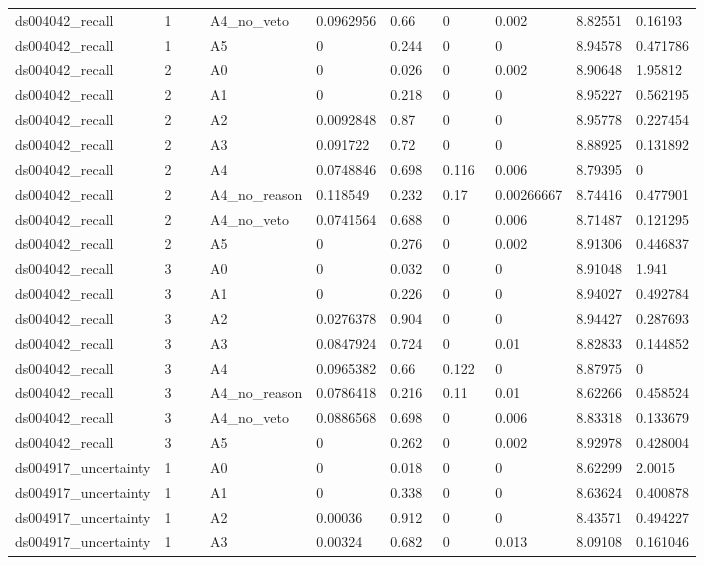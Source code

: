 \documentclass[11pt]{article}
\begin{document}
\begin{landscape}
\begin{longtable}{@{}L{0.120\linewidth}L{0.085\linewidth}L{0.085\linewidth}L{0.085\linewidth}L{0.085\linewidth}L{0.085\linewidth}L{0.085\linewidth}L{0.085\linewidth}L{0.085\linewidth}@{}}
ds004042\_recall & 1 & A4\_no\_veto & 0.0962956 & 0.66 & 0 & 0.002 & 8.82551 & 0.16193 \\
ds004042\_recall & 1 & A5 & 0 & 0.244 & 0 & 0 & 8.94578 & 0.471786 \\
ds004042\_recall & 2 & A0 & 0 & 0.026 & 0 & 0.002 & 8.90648 & 1.95812 \\
ds004042\_recall & 2 & A1 & 0 & 0.218 & 0 & 0 & 8.95227 & 0.562195 \\
ds004042\_recall & 2 & A2 & 0.0092848 & 0.87 & 0 & 0 & 8.95778 & 0.227454 \\
ds004042\_recall & 2 & A3 & 0.091722 & 0.72 & 0 & 0 & 8.88925 & 0.131892 \\
ds004042\_recall & 2 & A4 & 0.0748846 & 0.698 & 0.116 & 0.006 & 8.79395 & 0 \\
ds004042\_recall & 2 & A4\_no\_reason & 0.118549 & 0.232 & 0.17 & 0.00266667 & 8.74416 & 0.477901 \\
ds004042\_recall & 2 & A4\_no\_veto & 0.0741564 & 0.688 & 0 & 0.006 & 8.71487 & 0.121295 \\
ds004042\_recall & 2 & A5 & 0 & 0.276 & 0 & 0.002 & 8.91306 & 0.446837 \\
ds004042\_recall & 3 & A0 & 0 & 0.032 & 0 & 0 & 8.91048 & 1.941 \\
ds004042\_recall & 3 & A1 & 0 & 0.226 & 0 & 0 & 8.94027 & 0.492784 \\
ds004042\_recall & 3 & A2 & 0.0276378 & 0.904 & 0 & 0 & 8.94427 & 0.287693 \\
ds004042\_recall & 3 & A3 & 0.0847924 & 0.724 & 0 & 0.01 & 8.82833 & 0.144852 \\
ds004042\_recall & 3 & A4 & 0.0965382 & 0.66 & 0.122 & 0 & 8.87975 & 0 \\
ds004042\_recall & 3 & A4\_no\_reason & 0.0786418 & 0.216 & 0.11 & 0.01 & 8.62266 & 0.458524 \\
ds004042\_recall & 3 & A4\_no\_veto & 0.0886568 & 0.698 & 0 & 0.006 & 8.83318 & 0.133679 \\
ds004042\_recall & 3 & A5 & 0 & 0.262 & 0 & 0.002 & 8.92978 & 0.428004 \\
ds004917\_uncertainty & 1 & A0 & 0 & 0.018 & 0 & 0 & 8.62299 & 2.0015 \\
ds004917\_uncertainty & 1 & A1 & 0 & 0.338 & 0 & 0 & 8.63624 & 0.400878 \\
ds004917\_uncertainty & 1 & A2 & 0.00036 & 0.912 & 0 & 0 & 8.43571 & 0.494227 \\
ds004917\_uncertainty & 1 & A3 & 0.00324 & 0.682 & 0 & 0.013 & 8.09108 & 0.161046 \\

\end{longtable}
\end{landscape}
\end{document}

